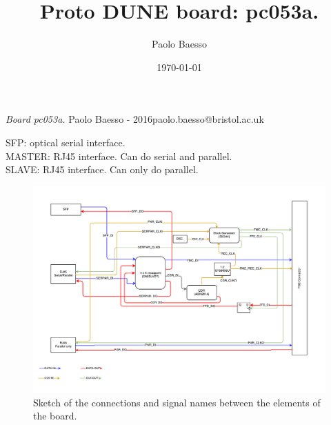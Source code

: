 \documentclass[10pt,twoside, fleqn]{memoir}
\author{Paolo Baesso}
\title{Proto DUNE board: pc053a.}
\date{\today}
\makeatletter
\def\maketitle{%
  \null
  \thispagestyle{empty}%
  \vfill
  \begin{center}\leavevmode
    \normalfont
    {\LARGE\raggedleft \@author\par}%
    \hrulefill\par
    {\huge\raggedright \@title\par}%
    \vskip 1cm
  {\Large \@date\par}%
  \end{center}%
  \vfill
  \null
  \cleardoublepage
  }
\makeatother
\begin{document}
\let\cleardoublepage\clearpage


\maketitle
\frontmatter

\null\vfill
\begin{flushleft}
\textit{Board pc053a.}\newline
\newline
Paolo Baesso - 2016\newline paolo.baesso@bristol.ac.uk
\bigskip

\end{flushleft}
\let\cleardoublepage\clearpage

\newpage
\tableofcontents

\mainmatter
\sloppy

\newenvironment{SpecialPar}
  {\begin{shaded}\noindent}
  {\end{shaded}}



\def\brd{pc052a}
%
\noindent SFP: optical serial interface.\\
MASTER: RJ45 interface. Can do serial and parallel.\\
SLAVE: RJ45 interface. Can only do parallel.\\



\begin{figure}[h]
  \centering
  \includegraphics[width=1.62\textwidth, angle=90]{./Images/protoDUNE_fmc_sfp_to_slave_v0-7.pdf}
  \caption{Sketch of the connections and signal names between the elements of the board.}\label{fig:Connections}
\end{figure}
\end{document}
